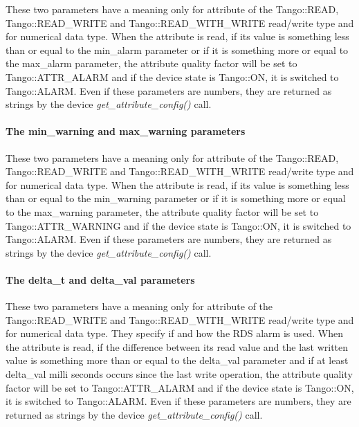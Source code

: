 These two parameters have a meaning only for attribute of the Tango::READ,
Tango::READ\_WRITE and Tango::READ\_WITH\_WRITE read/write type and
for numerical data type. When the attribute is read, if its value
is something less than or equal to the min\_alarm parameter or if
it is something more or equal to the max\_alarm parameter, the attribute
quality factor will be set to Tango::ATTR\_ALARM
and if the device state is Tango::ON, it is switched to Tango::ALARM.
Even if these parameters are numbers, they are returned as strings
by the device \emph{get\_attribute\_config()} call.


\paragraph{The min\_warning and max\_warning
parameters}

These two parameters have a meaning only for attribute of the Tango::READ,
Tango::READ\_WRITE and Tango::READ\_WITH\_WRITE read/write type and
for numerical data type. When the attribute is read, if its value
is something less than or equal to the min\_warning parameter or if
it is something more or equal to the max\_warning parameter, the attribute
quality factor will be set to Tango::ATTR\_WARNING
and if the device state is Tango::ON, it is switched to Tango::ALARM.
Even if these parameters are numbers, they are returned as strings
by the device \emph{get\_attribute\_config()} call.


\paragraph{The delta\_t and delta\_val parameters}

These two parameters have a meaning only for attribute of the Tango::READ\_WRITE
and Tango::READ\_WITH\_WRITE read/write type and for numerical data
type. They specify if and how the RDS alarm is used. When
the attribute is read, if the difference between its read value and
the last written value is something more than or equal to the delta\_val
parameter and if at least delta\_val milli seconds occurs since the
last write operation, the attribute quality factor will be set to
Tango::ATTR\_ALARM and if the device state is Tango::ON,
it is switched to Tango::ALARM. Even if these parameters
are numbers, they are returned as strings by the device \emph{get\_attribute\_config()}
call.


